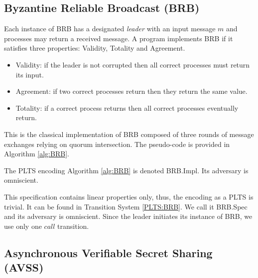 \subsection{Byzantine Reliable Broadcast (\textsf{BRB})}

Each instance of \textsf{BRB} has a designated \emph{leader} with an input message $m$ and
processes may return a received message.
A program implements \textsf{BRB} if it satisfies three properties: Validity, Totality and
Agreement.
\begin{itemize}
    \item Validity: if the leader is not corrupted then all correct processes must return its
    input.
    \item Agreement: if two correct processes return then they return the same value.
    \item Totality: if a correct process returns then all correct processes eventually return.
\end{itemize}

\begin{implementation}
    \label{impl:BRB}

    This is the classical implementation of \textsf{BRB} composed of
    three rounds of message exchanges relying on quorum intersection.
    The pseudo-code is provided in Algorithm \ref{alg:BRB}.
\end{implementation}

\begin{definition}
    \label{BRB:Impl}

    The PLTS encoding Algorithm \ref{alg:BRB} is denoted \textsf{BRB.Impl}.
    Its adversary is omniscient.
\end{definition}

\begin{specification}
    \label{BRB:Spec}

    This specification contains linear properties only, thus, the encoding
    as a PLTS is trivial. It can be found in Transition System \ref{PLTS:BRB}.
    We call it \textsf{BRB.Spec} and its adversary is omniscient.
    Since the leader initiates its instance of \textsf{BRB}, we use only one
    $call$ transition.
\end{specification}

\subsection{Asynchronous Verifiable Secret Sharing (\textsf{AVSS})}

